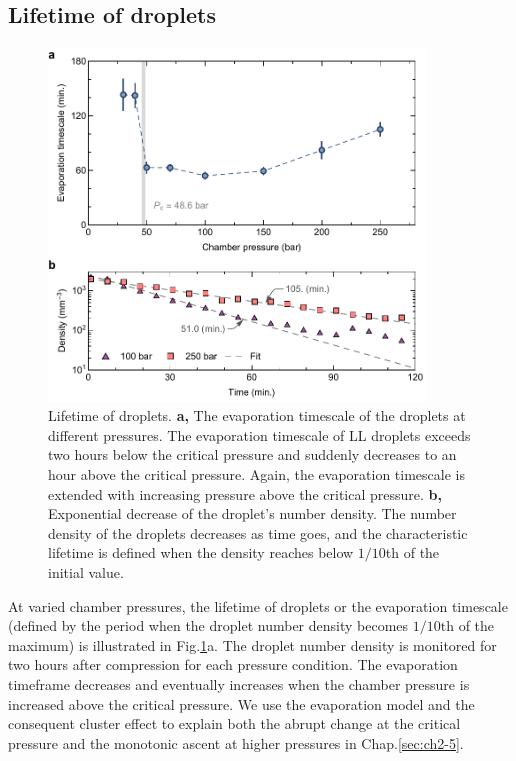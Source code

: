 \subsection{Lifetime of droplets}
\label{sec:ch2-3-3}

\begin{figure}[ht!]
\centering
\includegraphics[width=100mm]{figures/ch2/droplet/evaporation.pdf}
\caption{Lifetime of droplets. \textbf{a,} The evaporation timescale of the droplets at different pressures. The evaporation timescale of LL droplets exceeds two hours below the critical pressure and suddenly decreases to an hour above the critical pressure. Again, the evaporation timescale is extended with increasing pressure above the critical pressure. \textbf{b,} Exponential decrease of the droplet's number density. The number density of the droplets decreases as time goes, and the characteristic lifetime is defined when the density reaches below $1/10$th of the initial value.}
\label{fig:lifetime}
\end{figure}

At varied chamber pressures, the lifetime of droplets or the evaporation timescale (defined by the period when the droplet number density becomes $1/10\text{th}$ of the maximum) is illustrated in Fig.\ref{fig:lifetime}a. The droplet number density is monitored for two hours after compression for each pressure condition. The evaporation timeframe decreases and eventually increases when the chamber pressure is increased above the critical pressure. We use the evaporation model and the consequent cluster effect to explain both the abrupt change at the critical pressure and the monotonic ascent at higher pressures in Chap.\ref{sec:ch2-5}.

